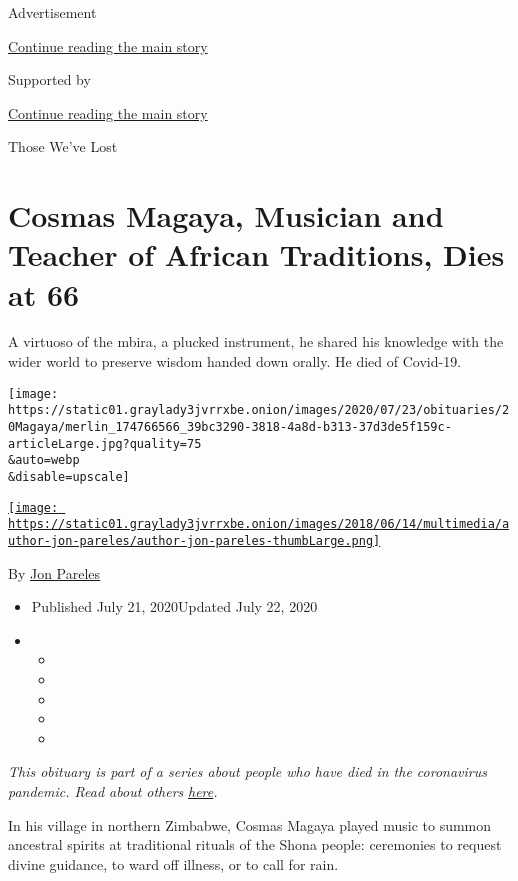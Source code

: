 Advertisement

\protect\hyperlink{after-top}{Continue reading the main story}

Supported by

\protect\hyperlink{after-sponsor}{Continue reading the main story}

Those We've Lost

\hypertarget{cosmas-magaya-musician-and-teacher-of-african-traditions-dies-at-66}{%
\section{Cosmas Magaya, Musician and Teacher of African Traditions, Dies
at
66}\label{cosmas-magaya-musician-and-teacher-of-african-traditions-dies-at-66}}

A virtuoso of the mbira, a plucked instrument, he shared his knowledge
with the wider world to preserve wisdom handed down orally. He died of
Covid-19.

\texttt{[image: https://static01.graylady3jvrrxbe.onion/images/2020/07/23/obituaries/20Magaya/merlin\_174766566\_39bc3290-3818-4a8d-b313-37d3de5f159c-articleLarge.jpg?quality=75\\\&auto=webp\\\&disable=upscale]}

\href{https://www.nytimes3xbfgragh.onion/by/jon-pareles}{\texttt{[image: https://static01.graylady3jvrrxbe.onion/images/2018/06/14/multimedia/author-jon-pareles/author-jon-pareles-thumbLarge.png]}}

By \href{https://www.nytimes3xbfgragh.onion/by/jon-pareles}{Jon Pareles}

\begin{itemize}
\item
  Published July 21, 2020Updated July 22, 2020
\item
  \begin{itemize}
  \item
  \item
  \item
  \item
  \item
  \end{itemize}
\end{itemize}

\emph{This obituary is part of a series about people who have died in
the coronavirus pandemic. Read about others}
\href{https://www.nytimes3xbfgragh.onion/interactive/2020/obituaries/people-died-coronavirus-obituaries.html}{\emph{here}}\emph{.}

In his village in northern Zimbabwe, Cosmas Magaya played music to
summon ancestral spirits at traditional rituals of the Shona people:
ceremonies to request divine guidance, to ward off illness, or to call
for rain.

